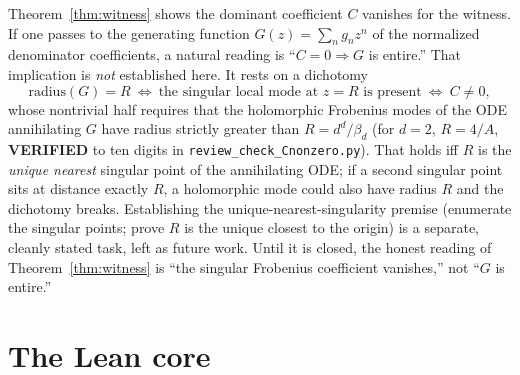 \documentclass[11pt]{article}
\begin{document}
Theorem~\ref{thm:witness} shows the dominant coefficient $C$ vanishes for the
witness. If one passes to the generating function $G(z)=\sum_n g_n z^n$ of the
normalized denominator coefficients, a natural reading is ``$C=0\Rightarrow G$ is
entire.'' That implication is \emph{not} established here. It rests on a dichotomy
\[
  \mathrm{radius}(G)=R\ \Longleftrightarrow\ \text{the singular local mode at }z=R
  \text{ is present}\ \Longleftrightarrow\ C\neq0,
\]
whose nontrivial half requires that the holomorphic Frobenius modes of the ODE
annihilating $G$ have radius strictly greater than $R=d^d/\beta_d$ (for $d=2$,
$R=4/A$, \textbf{VERIFIED} to ten digits in \texttt{review\_check\_Cnonzero.py}).
That holds iff $R$ is the \emph{unique nearest} singular point of the annihilating
ODE; if a second singular point sits at distance exactly $R$, a holomorphic mode
could also have radius $R$ and the dichotomy breaks. Establishing the
unique-nearest-singularity premise (enumerate the singular points; prove $R$ is the
unique closest to the origin) is a separate, cleanly stated task, left as future
work. Until it is closed, the honest reading of Theorem~\ref{thm:witness} is ``the
singular Frobenius coefficient vanishes,'' not ``$G$ is entire.''

\section{The Lean core}\label{sec:lean}
\end{document}
